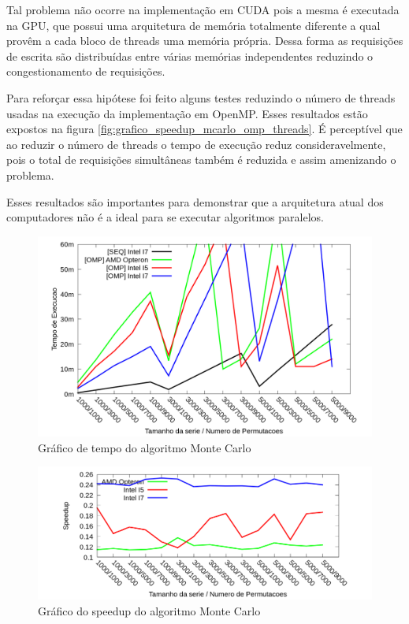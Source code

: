 Tal problema não ocorre na implementação em CUDA pois a mesma é executada na GPU, que possui uma arquitetura de memória totalmente diferente a qual provêm a cada bloco de threads uma memória própria. Dessa forma as requisições de escrita são distribuídas entre várias memórias independentes reduzindo o congestionamento de requisições.

Para reforçar essa hipótese foi feito alguns testes reduzindo o número de threads usadas na execução da implementação em OpenMP. Esses resultados estão expostos na figura \ref{fig:grafico_speedup_mcarlo_omp_threads}. É perceptível que ao reduzir o número de threads o tempo de execução reduz consideravelmente, pois o total de requisições simultâneas também é reduzida e assim amenizando o problema.

Esses resultados são importantes para demonstrar que a arquitetura atual dos computadores não é a ideal para se executar algoritmos paralelos.

\begin{figure}[H]
\centering
\includegraphics[width=1.0\textwidth]{Imagens/graficos_mcarlo/mcarlo_tempos_omp.png}
\caption{Gráfico de tempo do algoritmo Monte Carlo}
\label{fig:grafico_tempo_mcarlo_omp}
\end{figure}

\begin{figure}[H]
\centering
\includegraphics[width=1.0\textwidth]{Imagens/graficos_mcarlo/mcarlo_speedup_omp.png}
\caption{Gráfico do speedup do algoritmo Monte Carlo}
\label{fig:grafico_speedup_mcarlo_omp}
\end{figure}

